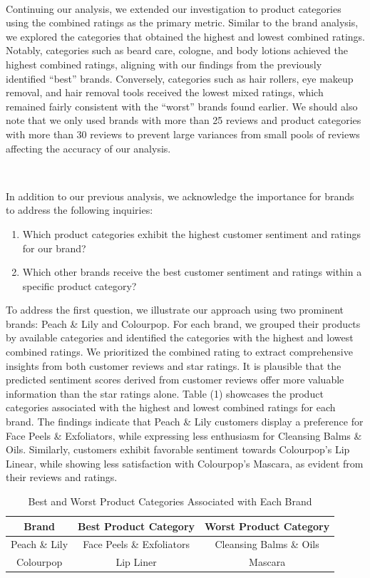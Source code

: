 \documentclass[10pt]{article}
\begin{document}
\

Continuing our analysis, we extended our investigation to product categories using the combined ratings as the primary metric. Similar to the brand analysis, we explored the categories that obtained the highest and lowest combined ratings. Notably, categories such as beard care, cologne, and body lotions achieved the highest combined ratings, aligning with our findings from the previously identified ``best'' brands. Conversely, categories such as hair rollers, eye makeup removal, and hair removal tools received the lowest mixed ratings, which remained fairly consistent with the ``worst'' brands found earlier. We should also note that we only used brands with more than 25 reviews and product categories with more than 30 reviews to prevent large variances from small pools of reviews affecting the accuracy of our analysis.

\

In addition to our previous analysis, we acknowledge the importance for brands to address the following inquiries:

\begin{enumerate}
    \item Which product categories exhibit the highest customer sentiment and ratings for our brand?
    \item Which other brands receive the best customer sentiment and ratings within a specific product category?
\end{enumerate}

To address the first question, we illustrate our approach using two prominent brands: Peach \& Lily and Colourpop. For each brand, we grouped their products by available categories and identified the categories with the highest and lowest combined ratings. We prioritized the combined rating to extract comprehensive insights from both customer reviews and star ratings. It is plausible that the predicted sentiment scores derived from customer reviews offer more valuable information than the star ratings alone. Table (1) showcases the product categories associated with the highest and lowest combined ratings for each brand. The findings indicate that Peach \& Lily customers display a preference for Face Peels \& Exfoliators, while expressing less enthusiasm for Cleansing Balms \& Oils. Similarly, customers exhibit favorable sentiment towards Colourpop's Lip Linear, while showing less satisfaction with Colourpop's Mascara, as evident from their reviews and ratings.

\begin{table}[h!]
    \centering
    \begin{tabular}{| c | c | c |} 
    \hline
    \textbf{Brand} & \textbf{Best Product Category} & \textbf{Worst Product Category} \\ 
    \hline
    \hline
    Peach \& Lily  & Face Peels \& Exfoliators & Cleansing Balms \& Oils \\
    \hline
    Colourpop  & Lip Liner & Mascara \\
    \hline  
    \end{tabular}
    \caption{Best and Worst Product Categories Associated with Each Brand}
\end{table}
\end{document}
